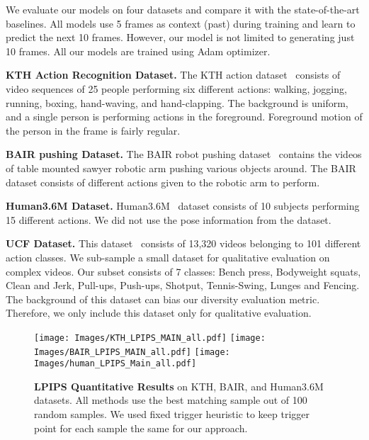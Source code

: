 \documentclass{article} \usepackage{iclr2021_conference,times}
\begin{document}
We evaluate our models on four datasets and compare it with the state-of-the-art baselines. All models use 5 frames as context (past) during training and learn to predict the next 10 frames. However, our model is not limited to generating just 10 frames. All our models are trained using Adam optimizer.



\noindent\textbf{KTH Action Recognition Dataset.} The KTH action dataset~\citep{1334462} consists of video sequences of 25 people performing six different actions: walking, jogging, running, boxing, hand-waving, and hand-clapping. The background is uniform, and a single person is performing actions in the foreground. Foreground motion of the person in the frame is fairly regular. 


\noindent\textbf{BAIR pushing Dataset.} The BAIR robot pushing dataset~\citep{ebert2017selfsupervised} contains the videos of table mounted sawyer robotic arm pushing various objects around. The BAIR dataset consists of different actions given to the robotic arm to perform. 

\noindent\textbf{Human3.6M Dataset.} Human3.6M~\citep{h36m_pami} dataset consists of 10 subjects performing 15 different actions. We did not use the pose information from the dataset.


\noindent\textbf{UCF Dataset.} This dataset~\citep{soomro2012ucf101} consists of 13,320 videos belonging to 101 different action classes. We sub-sample a small dataset for qualitative evaluation on complex videos. Our subset consists of 7 classes: Bench press, Bodyweight squats, Clean and Jerk, Pull-ups, Push-ups, Shotput, Tennis-Swing, Lunges and Fencing. The background of this dataset can bias our diversity evaluation metric. Therefore, we only include this dataset only for qualitative evaluation.

 
 \begin{figure*}[t]
    \centering

    \texttt{[image: Images/KTH\_LPIPS\_MAIN\_all.pdf]}\quad
    \texttt{[image: Images/BAIR\_LPIPS\_MAIN\_all.pdf]}\quad
    \texttt{[image: Images/human\_LPIPS\_Main\_all.pdf]}

    \caption{\textbf{LPIPS Quantitative Results} on KTH, BAIR, and Human3.6M datasets. All methods use the best matching sample out of 100 random samples. We used fixed trigger heuristic to keep trigger point for each sample the same for our approach.}
    \label{fig:plot_results}
    \vspace{-0.15in}
\end{figure*}
 
\end{document}

